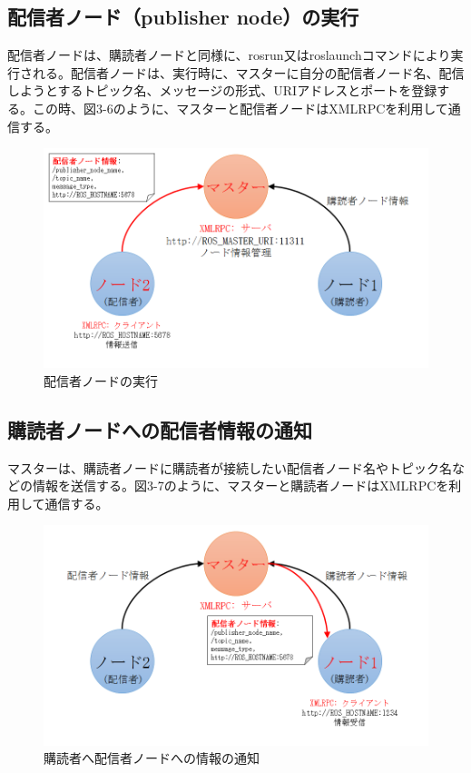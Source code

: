 \subsection{配信者ノード（publisher node）の実行}
配信者ノードは、購読者ノードと同様に、rosrun又はroslaunchコマンドにより実行される。配信者ノードは、実行時に、マスターに自分の配信者ノード名、配信しようとするトピック名、メッセージの形式、URIアドレスとポートを登録する。この時、図3-6のように、マスターと配信者ノードはXMLRPCを利用して通信する。

\begin{figure}[h]
  \centering
  \includegraphics[width=\columnwidth]{pictures/chapter3/pic_03_06.png}
  \caption{配信者ノードの実行}
\end{figure}

\subsection{購読者ノードへの配信者情報の通知}
マスターは、購読者ノードに購読者が接続したい配信者ノード名やトピック名などの情報を送信する。図3-7のように、マスターと購読者ノードはXMLRPCを利用して通信する。

\begin{figure}[h]
  \centering
  \includegraphics[width=\columnwidth]{pictures/chapter3/pic_03_07.png}
  \caption{購読者へ配信者ノードへの情報の通知}
\end{figure}

